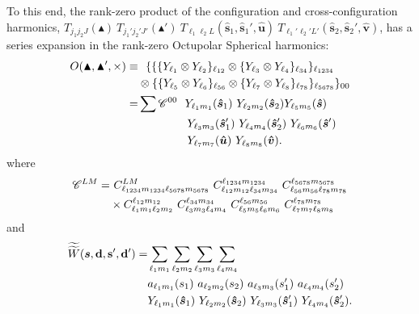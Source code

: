 \documentclass[useAMS,usenatbib]{mn2e}
\newcommand{\vb}[1]{\mathbf{#1}}
\begin{document}
To this end, the rank-zero product of the configuration and cross-configuration harmonics, $T_{j_1 j_2 J}(\blacktriangle) \ 
T_{j_1' j_2' J'}(\blacktriangle') \ T_{\ell_1 \ell_2 L}(\boldsymbol{\hat s}_1, \boldsymbol{\hat s}_1', \boldsymbol{\hat u})
\ T_{\ell_1' \ell_2' L'}(\boldsymbol{\hat s}_2, \boldsymbol{\hat s}_2', \boldsymbol{\hat v})$, has a series expansion in the rank-zero Octupolar Spherical harmonics: 
\begin{align}
O(\blacktriangle, \blacktriangle', \times) \equiv & \ \ \{ \{ \{ Y_{\ell_1} \otimes Y_{\ell_2} \}_{\ell_{12}} \otimes \{ Y_{\ell_3} \otimes Y_{\ell_4} \}_{\ell_{34}} \}_{\ell_{1234}} \notag \\ 
& \otimes
\{ \{ Y_{\ell_5} \otimes Y_{\ell_6} \}_{\ell_{56}} \otimes \{ Y_{\ell_7} \otimes Y_{\ell_8} \}_{\ell_{78}} \}_{\ell_{5678}} \}_{00} \notag \\
= & \sum \mathcal{C}^{00} \ 
\ Y_{\ell_1 m_1}(\boldsymbol{\hat s}_1)
\ Y_{\ell_2 m_2}(\boldsymbol{\hat s}_2)
  Y_{\ell_5 m_5}(\boldsymbol{\hat s})
\notag \\ 
& \qquad \qquad
\ Y_{\ell_3 m_3}(\boldsymbol{\hat s}_1')
\ Y_{\ell_4 m_4}(\boldsymbol{\hat s}_2')
\ Y_{\ell_6 m_6}(\boldsymbol{\hat s}')
\notag \\ 
& \qquad \qquad
\ Y_{\ell_7 m_7}(\boldsymbol{\hat u})
\ Y_{\ell_8 m_8}(\boldsymbol{\hat v}).
\end{align}
where 
\begin{align}
\mathcal{C}^{LM} = 
&\ C^{LM}_{\ell_{1234} m_{1234} \ell_{5678} m_{5678}} 
\ C^{\ell_{1234} m_{1234}}_{\ell_{12} m_{12} \ell_{34} m_{34}}
\ C^{\ell_{5678} m_{5678}}_{\ell_{56} m_{56} \ell_{78} m_{78}}\notag \\
& 
\times 
C^{\ell_{12}   m_{12}}_{\ell_1 m_1 \ell_2 m_2} 
\ C^{\ell_{34}   m_{34}}_{\ell_3 m_3 \ell_4 m_4}
\ C^{\ell_{56}   m_{56}}_{\ell_5 m_5 \ell_6 m_6}
\ C^{\ell_{78}   m_{78}}_{\ell_7 m_7 \ell_8 m_8}
\end{align}
and 
\begin{align}
    \widetilde{\widetilde W}(\boldsymbol{s}, \vb{d}, \vb{s}', \vb{d}') =    
    & \sum_{\ell_1 m_1} \sum_{\ell_2 m_2} \sum_{\ell_3 m_3} \sum_{\ell_4 m_4} \notag \\ 
    &a_{\ell_1 m_1}(s_1) \ a_{\ell_2 m_2}(s_2) \ a_{\ell_3 m_3}(s_1') \ a_{\ell_4 m_4}(s_2')\ \notag \\ 
    &Y_{\ell_1 m_1}(\boldsymbol {\hat s}_1) \ Y_{\ell_2 m_2}(\boldsymbol {\hat s}_2) \
    Y_{\ell_3 m_3}(\boldsymbol {\hat s}_1') \
    Y_{\ell_4 m_4}(\boldsymbol {\hat s}_2').
\end{align}
\end{document}
